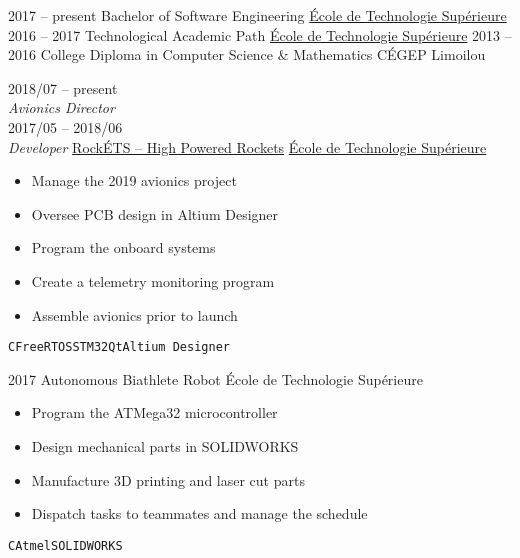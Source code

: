 \documentclass[9pt]{developercv} %
\begin{document}
\begin{minipage}[t]{0.8\textwidth}

\begin{entrylist}
	\entry
		{2017 -- present}
		{Bachelor of Software Engineering}
		{\href{https://etsmtl.ca}{École de Technologie Supérieure}}
		{\vspace{-14pt}}
	\entry
		{2016 -- 2017}
		{Technological Academic Path}
		{\href{https://etsmtl.ca}{École de Technologie Supérieure}}
		{\vspace{-14pt}}
	\entry
		{2013 -- 2016}
		{College Diploma in Computer Science \& Mathematics}
		{CÉGEP Limoilou}
		{\vspace{-14pt}}
\end{entrylist}



\begin{entrylist}
	\entry
		{2018/07 -- present\\{\small\emph{Avionics Director}}\\2017/05 -- 2018/06\\{\small\emph{Developer}}}
		{\href{https://clubrockets.ca/en/}{RockÉTS -- High Powered Rockets}}
		{\href{https://clubrockets.ca/en/}{École de Technologie Supérieure}}
		{
			\vspace{-14pt}
			\begin{itemize}
				\renewcommand{\labelitemi}{\raisebox{.45ex}{\rule{.6ex}{.6ex}}}
				\setlength\itemsep{-1pt}
				\item Manage the 2019 avionics project
				\item Oversee PCB design in Altium Designer
				\item Program the onboard systems
				\item Create a telemetry monitoring program
				\item Assemble avionics prior to launch
			\end{itemize}
			\vspace{-4pt}
			\texttt{C}\slashsep\texttt{FreeRTOS}\slashsep\texttt{STM32}\slashsep\texttt{Qt}\slashsep\texttt{Altium Designer}
		}
	\entry
		{2017}
		{Autonomous Biathlete Robot}
		{École de Technologie Supérieure}
		{
			\vspace{-14pt}
			\begin{itemize}
				\renewcommand{\labelitemi}{\raisebox{.45ex}{\rule{.6ex}{.6ex}}}
				\setlength\itemsep{-1pt}
				\item Program the ATMega32 microcontroller
				\item Design mechanical parts in SOLIDWORKS
				\item Manufacture 3D printing and laser cut parts 
				\item Dispatch tasks to teammates and manage the schedule
			\end{itemize}
			\vspace{-4pt}
			\texttt{C}\slashsep\texttt{Atmel}\slashsep\texttt{SOLIDWORKS}
		}
\end{entrylist}


\end{minipage}
\end{document}
